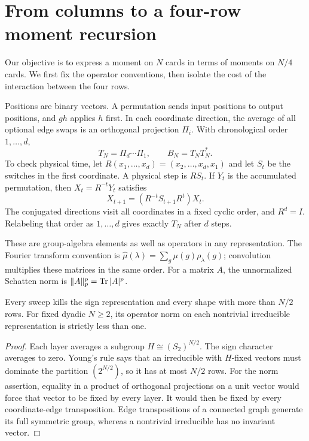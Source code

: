 \section{From columns to a four-row moment recursion}\label{sec:recursion}
Our objective is to express a moment on $N$ cards in terms of moments on $N/4$ cards. We first fix the operator conventions, then isolate the cost of the interaction between the four rows.

Positions are binary vectors. A permutation sends input positions to output positions, and $gh$ applies $h$ first. In each coordinate direction, the average of all optional edge swaps is an orthogonal projection $\Pi_i$. With chronological order $1,\ldots,d$,
\[
 T_N=\Pi_d\cdots\Pi_1,\qquad B_N=T_NT_N^*.
\]
To check physical time, let $R(x_1,\ldots,x_d)=(x_2,\ldots,x_d,x_1)$ and let $S_t$ be the switches in the first coordinate. A physical step is $RS_t$. If $Y_t$ is the accumulated permutation, then $X_t=R^{-t}Y_t$ satisfies
\[
 X_{t+1}=(R^{-t}S_{t+1}R^t)X_t.
\]
The conjugated directions visit all coordinates in a fixed cyclic order, and $R^d=I$. Relabeling that order as $1,\ldots,d$ gives exactly $T_N$ after $d$ steps.

These are group-algebra elements as well as operators in any representation. The Fourier transform convention is $\widehat\mu(\lambda)=\sum_g\mu(g)\rho_\lambda(g)$; convolution multiplies these matrices in the same order. For a matrix $A$, the unnormalized Schatten norm is $\|A\|_p^p=\operatorname{Tr}|A|^p$.

\begin{lemma}\label{lem:gap}
Every sweep kills the sign representation and every shape with more than $N/2$ rows. For fixed dyadic $N\ge2$, its operator norm on each nontrivial irreducible representation is strictly less than one.
\end{lemma}
\begin{proof}
Each layer averages a subgroup $H\cong(S_2)^{N/2}$. The sign character averages to zero. Young's rule says that an irreducible with $H$-fixed vectors must dominate the partition $(2^{N/2})$, so it has at most $N/2$ rows. For the norm assertion, equality in a product of orthogonal projections on a unit vector would force that vector to be fixed by every layer. It would then be fixed by every coordinate-edge transposition. Edge transpositions of a connected graph generate its full symmetric group, whereas a nontrivial irreducible has no invariant vector.
\end{proof}

